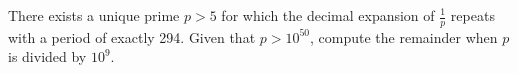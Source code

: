 There exists a unique prime $p > 5$ for which the decimal expansion of $\tfrac{1}{p}$ repeats with a period of exactly 294. Given that $p > 10^{50}$, compute the remainder when $p$ is divided by $10^9$.
